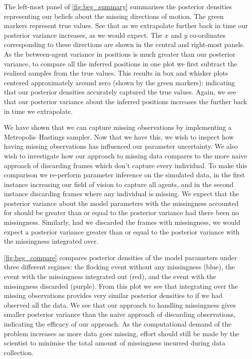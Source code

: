 The left-most panel of \cref{fig:beg_summary} summarises the posterior
densities representing our beliefs about the missing directions of motion. The
green markers represent true values. See that as we extrapolate further back in
time our posterior variance increases, as we would expect. The $x$ and $y$
co-ordinates corresponding to these directions are shown in the central and
right-most panels. As the between-agent variance in positions is much greater
than our posterior variance, to compare all the inferred positions in one plot
we first subtract the realised samples from the true values. This results in
box and whisker plots centered approximately around zero (shown by the green
markers): indicating that our posterior densities accurately captured the true
values. Again, we see that our posterior variance about the inferred positions
increases the further back in time we extrapolate.

We have shown that we can capture missing observations by implementing a
Metropolis--Hastings sampler. Now that we have this, we wish to inspect how
having missing observations has influenced our parameter uncertainty. We also
wish to investigate how our approach to missing data compares to the more
naive approach of discarding frames which don't capture every individual. To
make this comparison we re-perform parameter inference on the simulated data,
in the first instance increasing our field of vision to capture all
agents, and in the second instance discarding frames where any individual is
missing. We expect that the posterior variance about the model parameters with
the missingness accounted for should be greater than or equal to the posterior
variance had there been no missingness. Similarly, had we discarded the frames
with missingness, we would expect a posterior variance greater than or equal to
the posterior variance with the missingness integrated over. 

\cref{fig:beg_compare} compares posterior densities of the model parameters
under three different regimes: the flocking event without any missingness
(blue), the event with the missingness integrated out (red), and the event with
the missingness discarded (purple). From this plot we see that integrating over
the missing observations provides very similar posterior densities to if we had
observed all the data. We see that our approach to handling missingness gives
smaller posterior variance than the naive approach of discarding observations,
indicating the efficacy of our approach. As the computational demand of the
problem increases as more data goes missing, effort should still be made by the
scientist to minimise the total amount of missingness incurred during data
collection.

